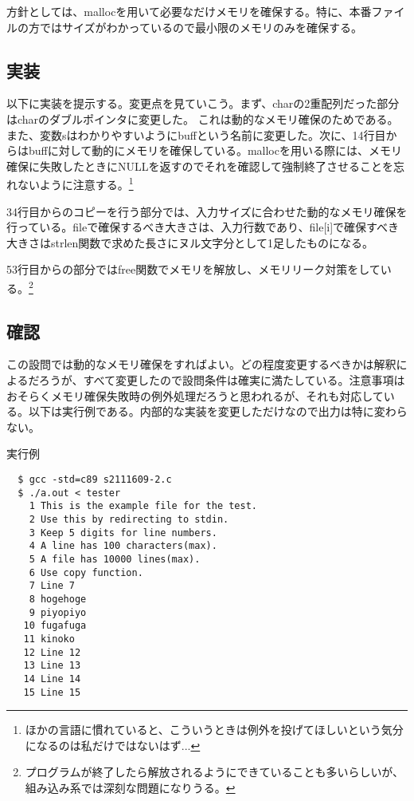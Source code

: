 \documentclass[dvipdfmx,12pt,a4j]{jarticle}
\begin{document}
方針としては、mallocを用いて必要なだけメモリを確保する。特に、本番ファイルの方ではサイズがわかっているので最小限のメモリのみを確保する。

\subsection{実装}
以下に実装を提示する。変更点を見ていこう。まず、charの2重配列だった部分はcharのダブルポインタに変更した。
これは動的なメモリ確保のためである。また、変数sはわかりやすいようにbuffという名前に変更した。次に、14行目からはbuffに対して動的にメモリを確保している。mallocを用いる際には、メモリ確保に失敗したときにNULLを返すのでそれを確認して強制終了させることを忘れないように注意する。\footnote{ほかの言語に慣れていると、こういうときは例外を投げてほしいという気分になるのは私だけではないはず...}

34行目からのコピーを行う部分では、入力サイズに合わせた動的なメモリ確保を行っている。fileで確保するべき大きさは、入力行数であり、file[i]で確保すべき大きさはstrlen関数で求めた長さにヌル文字分として1足したものになる。

53行目からの部分ではfree関数でメモリを解放し、メモリリーク対策をしている。\footnote{プログラムが終了したら解放されるようにできていることも多いらしいが、組み込み系では深刻な問題になりうる。}


\subsection{確認}
この設問では動的なメモリ確保をすればよい。どの程度変更するべきかは解釈によるだろうが、すべて変更したので設問条件は確実に満たしている。注意事項はおそらくメモリ確保失敗時の例外処理だろうと思われるが、それも対応している。以下は実行例である。内部的な実装を変更しただけなので出力は特に変わらない。

\begin{itembox}[l]{実行例}
\begin{verbatim}
  $ gcc -std=c89 s2111609-2.c
  $ ./a.out < tester
    1 This is the example file for the test.
    2 Use this by redirecting to stdin.
    3 Keep 5 digits for line numbers.
    4 A line has 100 characters(max).
    5 A file has 10000 lines(max).
    6 Use copy function.
    7 Line 7
    8 hogehoge
    9 piyopiyo
   10 fugafuga
   11 kinoko
   12 Line 12
   13 Line 13
   14 Line 14
   15 Line 15
\end{verbatim}
\end{itembox}
\end{document}
